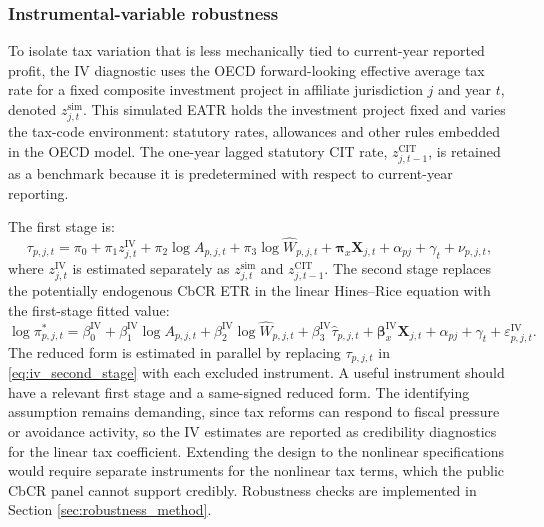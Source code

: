 \documentclass[11pt,a4paper]{article}
\begin{document}
\subsubsection{Instrumental-variable robustness}\label{sec:iv_strategy}

To isolate tax variation that is less mechanically tied to current-year reported profit, the IV diagnostic uses the OECD forward-looking effective average tax rate for a fixed composite investment project in affiliate jurisdiction $j$ and year $t$, denoted $z_{j,t}^{\text{sim}}$. This simulated EATR holds the investment project fixed and varies the tax-code environment: statutory rates, allowances and other rules embedded in the OECD model. The one-year lagged statutory CIT rate, $z_{j,t-1}^{\text{CIT}}$, is retained as a benchmark because it is predetermined with respect to current-year reporting.

The first stage is:
\begin{equation}\label{eq:iv_first_stage}
\tau_{p,j,t} = \pi_0 + \pi_1 z_{j,t}^{\text{IV}} + \pi_2 \log A_{p,j,t} + \pi_3 \log \hat{W}_{p,j,t} + \mathbf{\pi}_x \mathbf{X}_{j,t} + \alpha_{pj} + \gamma_t + \nu_{p,j,t},
\end{equation}
where $z_{j,t}^{\text{IV}}$ is estimated separately as $z_{j,t}^{\text{sim}}$ and $z_{j,t-1}^{\text{CIT}}$.
The second stage replaces the potentially endogenous CbCR ETR in the linear Hines--Rice equation with the first-stage fitted value:
\begin{equation}\label{eq:iv_second_stage}
\log \pi_{p,j,t}^{*} = \beta_0^{\text{IV}} + \beta_1^{\text{IV}} \log A_{p,j,t} + \beta_2^{\text{IV}} \log \hat{W}_{p,j,t} + \beta_3^{\text{IV}} \widehat{\tau}_{p,j,t} + \mathbf{\beta}_x^{\text{IV}} \mathbf{X}_{j,t} + \alpha_{pj} + \gamma_t + \varepsilon_{p,j,t}^{\text{IV}}.
\end{equation}
The reduced form is estimated in parallel by replacing $\tau_{p,j,t}$ in \eqref{eq:iv_second_stage} with each excluded instrument. A useful instrument should have a relevant first stage and a same-signed reduced form. The identifying assumption remains demanding, since tax reforms can respond to fiscal pressure or avoidance activity, so the IV estimates are reported as credibility diagnostics for the linear tax coefficient. Extending the design to the nonlinear specifications would require separate instruments for the nonlinear tax terms, which the public CbCR panel cannot support credibly. Robustness checks are implemented in Section \ref{sec:robustness_method}.
\end{document}
